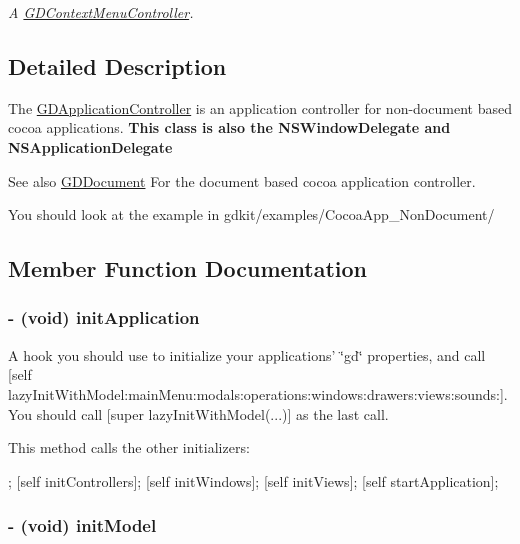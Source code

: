\begin{DoxyCompactItemize}
\begin{DoxyCompactList}\small\item\em A \hyperlink{interface_g_d_context_menu_controller}{GDContextMenuController}. \item\end{DoxyCompactList}\end{DoxyCompactItemize}


\subsection{Detailed Description}
The \hyperlink{interface_g_d_application_controller}{GDApplicationController} is an application controller for non-\/document based cocoa applications. {\bfseries This class is also the NSWindowDelegate and NSApplicationDelegate}

\begin{DoxySeeAlso}{See also}
\hyperlink{interface_g_d_document}{GDDocument} For the document based cocoa application controller. 

You should look at the example in gdkit/examples/CocoaApp\_\-NonDocument/ 
\end{DoxySeeAlso}


\subsection{Member Function Documentation}
\hypertarget{interface_g_d_application_controller_aa052dc548b3c87861b1c4b0ccd4eb44e}{
\subsubsection[{initApplication}]{\setlength{\rightskip}{0pt plus 5cm}-\/ (void) initApplication }}
\label{interface_g_d_application_controller_aa052dc548b3c87861b1c4b0ccd4eb44e}


A hook you should use to initialize your applications' \char`\"{}gd\char`\"{} properties, and call \mbox{[}self lazyInitWithModel:mainMenu:modals:operations:windows:drawers:views:sounds:\mbox{]}. You should call \mbox{[}super lazyInitWithModel(...)\mbox{]} as the last call.

This method calls the other initializers:


\begin{DoxyCode}
 ;
 [self initControllers];
 [self initWindows];
 [self initViews];
 [self startApplication];
\end{DoxyCode}
 \hypertarget{interface_g_d_application_controller_aeb11e53b580e91da5d776b4adc4523a3}{
\subsubsection[{initModel}]{\setlength{\rightskip}{0pt plus 5cm}-\/ (void) initModel }}
\label{interface_g_d_application_controller_aeb11e53b580e91da5d776b4adc4523a3}


